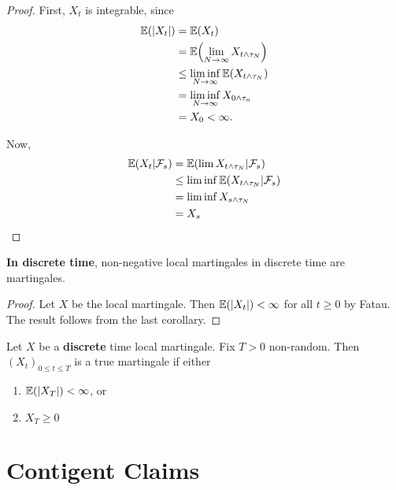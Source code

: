 \begin{proof}
  First, $X_{t}$ is integrable, since
  \begin{align}
    \label{eq:17}
    \E{|X_{t}|} &= \E{X_{t}} \\
    &= \E{\lim_{N \rightarrow \infty} X_{t \wedge \tau_{N}}} \\
    &\leq \liminf_{N \rightarrow \infty} \E{X_{t \wedge \tau_{N}}} \\
    &= \liminf_{N \rightarrow \infty} X_{0 \wedge \tau_{n}} \\
    &= X_{0} < \infty.
  \end{align}
  
  Now,
  \begin{align}
    \label{eq:16}
    \E{X_{t} | \mathcal{F}_{s}} &= \E{\lim X_{t \wedge \tau_{N}} |
      \mathcal{F}_{s}} \\
    &\leq \liminf \E{X_{t \wedge \tau_{N}} | \mathcal{F}_{s}} \\
    &= \liminf X_{s \wedge \tau_{N}} \\
    &= X_{s}
  \end{align}
\end{proof}

\begin{corollary}
  \textbf{In discrete time}, non-negative local martingales in
  discrete time are martingales.
\end{corollary}

\begin{proof}
  Let $X$ be the local martingale. Then $\E{|X_{t}|} < \infty$ for all
  $t \geq 0$ by Fatau. The result follows from the last corollary.
\end{proof}

\begin{thm}
  \label{defn:discrete_time_models:18}
  Let $X$ be a \textbf{discrete} time local martingale. Fix $T > 0$
  non-random. Then $(X_{t})_{0 \leq t \leq T}$ is a true martingale if
  either
  \begin{enumerate}
  \item $\E{|X_{T}|} < \infty$, or
  \item $X_T \geq 0$ 
  \end{enumerate}
\end{thm}


\section{Contigent Claims}
\label{sec:contigent-claims}

